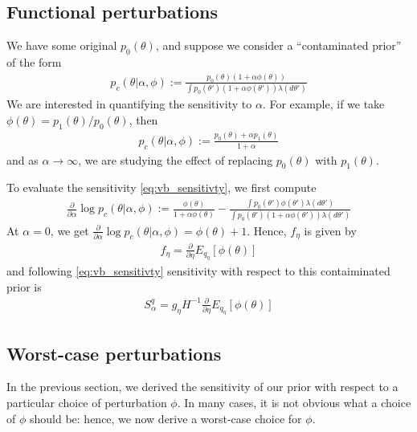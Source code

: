\documentclass[a4paper]{article}
\begin{document}
\subsection{Functional perturbations}
\label{sec:func_pert}
We have some original $p_0(\theta)$, and suppose we consider a
``contaminated prior'' of the form
\begin{align}
	p_c(\theta | \alpha, \phi) :=  \frac{p_0(\theta)(1 + \alpha \phi(\theta))}
	{\int p_0(\theta')(1 + \alpha \phi(\theta'))\lambda(d\theta')}
\end{align}
We are interested in quantifying the sensitivity to $\alpha$. For example, if we take
$\phi(\theta) = p_1(\theta) / p_0(\theta)$, then
\begin{align}
	p_c(\theta | \alpha, \phi) :=  \frac{p_0(\theta) + \alpha p_1(\theta)}
	{1 + \alpha}
\end{align}
and as $\alpha \rightarrow \infty$, we are studying the effect of replacing $p_0(\theta)$ with $p_1(\theta)$.

To evaluate the sensitivity \ref{eq:vb_sensitivty}, we first compute
\begin{align}
	\frac{\partial}{\partial \alpha} \log p_c(\theta | \alpha, \phi) :=
		\frac{\phi(\theta)}{1 + \alpha \phi(\theta)}
		- \frac{\int p_0(\theta')\phi(\theta') \lambda(d\theta')}{
		\int p_0(\theta')(1 + \alpha \phi(\theta'))\lambda(d\theta')
		}
\end{align}
At $\alpha = 0$, we get
$\frac{\partial}{\partial \alpha} \log p_c(\theta | \alpha, \phi)
= \phi(\theta) + 1$.
Hence, $f_\eta$ is given by
\begin{align}
	f_\eta = \frac{\partial}{\partial \eta} E_{q_\eta}[\phi(\theta)]
\end{align}
and following \ref{eq:vb_sensitivty} sensitivity with respect to this contaiminated prior is
\begin{align}
	S^q_\alpha = g_\eta H^{-1}\frac{\partial}{\partial \eta} E_{q_\eta}[\phi(\theta)]
	\label{eq:func_sensitivity}
\end{align}

\subsection{Worst-case perturbations}
In the previous section, we derived the sensitivity of our prior with respect to a
particular choice of perturbation $\phi$. In many cases, it is not obvious what
a choice of $\phi$ should be: hence, we now derive a worst-case choice for $\phi$.
\end{document}
